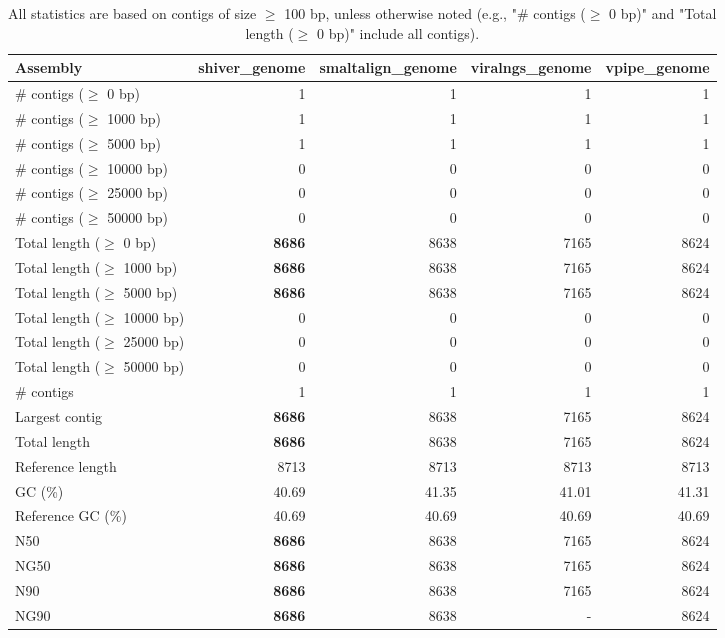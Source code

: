 \documentclass[12pt,a4paper]{article}
\begin{document}
\begin{table}[ht]
\begin{center}
\caption{All statistics are based on contigs of size $\geq$ 100 bp, unless otherwise noted (e.g., "\# contigs ($\geq$ 0 bp)" and "Total length ($\geq$ 0 bp)" include all contigs).}
\begin{tabular}{|l*{4}{|r}|}
\hline
Assembly & shiver\_genome & smaltalign\_genome & viralngs\_genome & vpipe\_genome \\ \hline
\# contigs ($\geq$ 0 bp) & 1 & 1 & 1 & 1 \\ \hline
\# contigs ($\geq$ 1000 bp) & 1 & 1 & 1 & 1 \\ \hline
\# contigs ($\geq$ 5000 bp) & 1 & 1 & 1 & 1 \\ \hline
\# contigs ($\geq$ 10000 bp) & 0 & 0 & 0 & 0 \\ \hline
\# contigs ($\geq$ 25000 bp) & 0 & 0 & 0 & 0 \\ \hline
\# contigs ($\geq$ 50000 bp) & 0 & 0 & 0 & 0 \\ \hline
Total length ($\geq$ 0 bp) & {\bf 8686} & 8638 & 7165 & 8624 \\ \hline
Total length ($\geq$ 1000 bp) & {\bf 8686} & 8638 & 7165 & 8624 \\ \hline
Total length ($\geq$ 5000 bp) & {\bf 8686} & 8638 & 7165 & 8624 \\ \hline
Total length ($\geq$ 10000 bp) & 0 & 0 & 0 & 0 \\ \hline
Total length ($\geq$ 25000 bp) & 0 & 0 & 0 & 0 \\ \hline
Total length ($\geq$ 50000 bp) & 0 & 0 & 0 & 0 \\ \hline
\# contigs & 1 & 1 & 1 & 1 \\ \hline
Largest contig & {\bf 8686} & 8638 & 7165 & 8624 \\ \hline
Total length & {\bf 8686} & 8638 & 7165 & 8624 \\ \hline
Reference length & 8713 & 8713 & 8713 & 8713 \\ \hline
GC (\%) & 40.69 & 41.35 & 41.01 & 41.31 \\ \hline
Reference GC (\%) & 40.69 & 40.69 & 40.69 & 40.69 \\ \hline
N50 & {\bf 8686} & 8638 & 7165 & 8624 \\ \hline
NG50 & {\bf 8686} & 8638 & 7165 & 8624 \\ \hline
N90 & {\bf 8686} & 8638 & 7165 & 8624 \\ \hline
NG90 & {\bf 8686} & 8638 & - & 8624 \\ \hline

\end{tabular}
\end{center}
\end{table}
\end{document}
